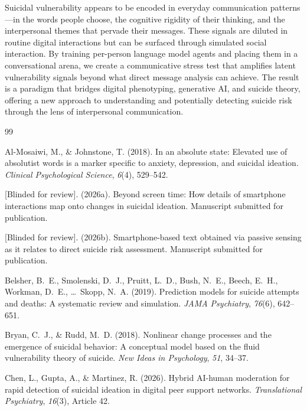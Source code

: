 \documentclass[review,12pt,authoryear]{elsarticle}
\begin{document}
Suicidal vulnerability appears to be encoded in everyday communication patterns---in the words people choose, the cognitive rigidity of their thinking, and the interpersonal themes that pervade their messages. These signals are diluted in routine digital interactions but can be surfaced through simulated social interaction. By training per-person language model agents and placing them in a conversational arena, we create a communicative stress test that amplifies latent vulnerability signals beyond what direct message analysis can achieve. The result is a paradigm that bridges digital phenotyping, generative AI, and suicide theory, offering a new approach to understanding and potentially detecting suicide risk through the lens of interpersonal communication.


\begin{thebibliography}{99}

Al-Mosaiwi, M., \& Johnstone, T. (2018).
\newblock In an absolute state: {E}levated use of absolutist words is a marker specific to anxiety, depression, and suicidal ideation.
\newblock \textit{Clinical Psychological Science}, \textit{6}(4), 529--542.

[Blinded for review]. (2026a).
\newblock Beyond screen time: {H}ow details of smartphone interactions map onto changes in suicidal ideation.
\newblock Manuscript submitted for publication.

[Blinded for review]. (2026b).
\newblock Smartphone-based text obtained via passive sensing as it relates to direct suicide risk assessment.
\newblock Manuscript submitted for publication.

Belsher, B.~E., Smolenski, D.~J., Pruitt, L.~D., Bush, N.~E., Beech, E.~H., Workman, D.~E., \ldots\ Skopp, N.~A. (2019).
\newblock Prediction models for suicide attempts and deaths: {A} systematic review and simulation.
\newblock \textit{JAMA Psychiatry}, \textit{76}(6), 642--651.

Bryan, C.~J., \& Rudd, M.~D. (2018).
\newblock Nonlinear change processes and the emergence of suicidal behavior: {A} conceptual model based on the fluid vulnerability theory of suicide.
\newblock \textit{New Ideas in Psychology}, \textit{51}, 34--37.

Chen, L., Gupta, A., \& Martinez, R. (2026).
\newblock Hybrid AI-human moderation for rapid detection of suicidal ideation in digital peer support networks.
\newblock \textit{Translational Psychiatry}, \textit{16}(3), Article 42.


\end{thebibliography}
\end{document}
